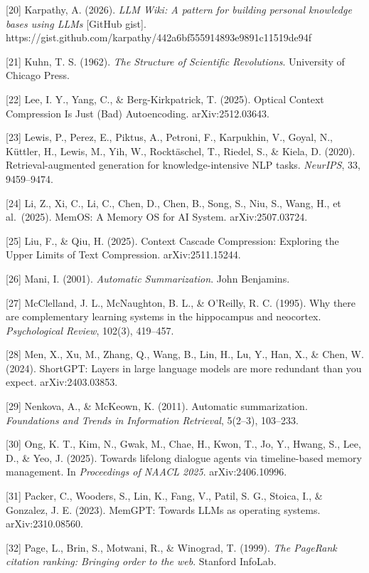 \documentclass[
  11pt,
]{article}
\begin{document}
{[}20{]} Karpathy, A. (2026). \emph{LLM Wiki: A pattern for building
personal knowledge bases using LLMs} {[}GitHub gist{]}.
https://gist.github.com/karpathy/442a6bf555914893e9891c11519de94f

{[}21{]} Kuhn, T. S. (1962). \emph{The Structure of Scientific
Revolutions}. University of Chicago Press.

{[}22{]} Lee, I. Y., Yang, C., \& Berg-Kirkpatrick, T. (2025). Optical
Context Compression Is Just (Bad) Autoencoding. arXiv:2512.03643.

{[}23{]} Lewis, P., Perez, E., Piktus, A., Petroni, F., Karpukhin, V.,
Goyal, N., Küttler, H., Lewis, M., Yih, W., Rocktäschel, T., Riedel, S.,
\& Kiela, D. (2020). Retrieval-augmented generation for
knowledge-intensive NLP tasks. \emph{NeurIPS}, 33, 9459--9474.

{[}24{]} Li, Z., Xi, C., Li, C., Chen, D., Chen, B., Song, S., Niu, S.,
Wang, H., et al.~(2025). MemOS: A Memory OS for AI System.
arXiv:2507.03724.

{[}25{]} Liu, F., \& Qiu, H. (2025). Context Cascade Compression:
Exploring the Upper Limits of Text Compression. arXiv:2511.15244.

{[}26{]} Mani, I. (2001). \emph{Automatic Summarization}. John
Benjamins.

{[}27{]} McClelland, J. L., McNaughton, B. L., \& O'Reilly, R. C.
(1995). Why there are complementary learning systems in the hippocampus
and neocortex. \emph{Psychological Review}, 102(3), 419--457.

{[}28{]} Men, X., Xu, M., Zhang, Q., Wang, B., Lin, H., Lu, Y., Han, X.,
\& Chen, W. (2024). ShortGPT: Layers in large language models are more
redundant than you expect. arXiv:2403.03853.

{[}29{]} Nenkova, A., \& McKeown, K. (2011). Automatic summarization.
\emph{Foundations and Trends in Information Retrieval}, 5(2--3),
103--233.

{[}30{]} Ong, K. T., Kim, N., Gwak, M., Chae, H., Kwon, T., Jo, Y.,
Hwang, S., Lee, D., \& Yeo, J. (2025). Towards lifelong dialogue agents
via timeline-based memory management. In \emph{Proceedings of NAACL
2025}. arXiv:2406.10996.

{[}31{]} Packer, C., Wooders, S., Lin, K., Fang, V., Patil, S. G.,
Stoica, I., \& Gonzalez, J. E. (2023). MemGPT: Towards LLMs as operating
systems. arXiv:2310.08560.

{[}32{]} Page, L., Brin, S., Motwani, R., \& Winograd, T. (1999).
\emph{The PageRank citation ranking: Bringing order to the web}.
Stanford InfoLab.
\end{document}
